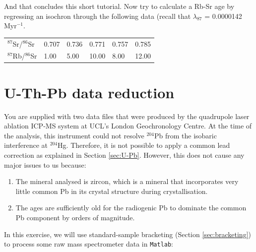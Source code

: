 \documentclass{book}
\begin{document}
And that concludes this short tutorial. Now try to calculate a Rb-Sr
age by regressing an isochron through the following data (recall that
$\lambda_{87}$ = 0.0000142 Myr$^{-1}$.%

\begin{table}[!ht]
\centering
\begin{tabular}{l|lllll}
$^{87}$Sr/$^{86}$Sr & 0.707 & 0.736 & 0.771 & 0.757 & 0.785\\
$^{87}$Rb/$^{86}$Sr & 1.00 & 5.00 & 10.00 & 8.00 & 12.00
\end{tabular}
\end{table}

\section{U-Th-Pb data reduction}
\label{sec:U-Pb-R}

You are supplied with two data files that were produced by the
quadrupole laser ablation ICP-MS system at UCL's London Geochronology
Centre. At the time of the analysis, this instrument could not resolve
$^{204}$Pb from the isobaric interference at $^{204}$Hg. Therefore, it
is not possible to apply a common lead correction as explained in
Section \ref{sec:U-Pb}. However, this does not cause any major issues
to us because:

\begin{enumerate}
\item The mineral analysed is zircon, which is a mineral that
  incorporates very little common Pb in its crystal structure during
  crystallisation.
\item The ages are sufficiently old for the radiogenic Pb to dominate
  the common Pb component by orders of magnitude.
\end{enumerate}

In this exercise, we will use standard-sample bracketing (Section
\ref{sec:bracketing}) to process some raw mass spectrometer data in
    {\tt Matlab}:
\end{document}
